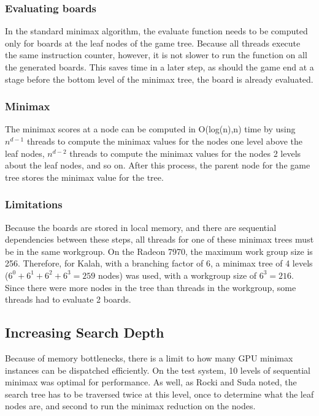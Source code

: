 \documentclass{article}
\begin{document}
\subsubsection{Evaluating boards}
In the standard minimax algorithm, the evaluate function needs to be computed only for boards at the leaf nodes of the game tree. Because all threads execute the same instruction counter, however, it is not slower to run the function on all the generated boards. This saves time in a later step, as should the game end at a stage before the bottom level of the minimax tree, the board is already evaluated.

\subsubsection{Minimax}
The minimax scores at a node can be computed in O(log(n),n) time by using $n^{d-1}$ threads to compute the minimax values for the nodes one level above the leaf nodes, $n^{d-2}$ threads to compute the minimax values for the nodes 2 levels about the leaf nodes, and so on. After this process, the parent node for the game tree stores the minimax value for the tree.

\subsubsection{Limitations}
Because the boards are stored in local memory, and there are sequential dependencies between these steps, all threads for one of these minimax trees must be in the same workgroup. On the Radeon 7970, the maximum work group size is 256. Therefore, for Kalah, with a branching factor of 6, a minimax tree of 4 levels ($6^0 + 6^1 + 6^2 + 6^3 = 259$ nodes) was used, with a workgroup size of $6^3 = 216$. Since there were more nodes in the tree than threads in the workgroup, some threads had to evaluate 2 boards.

\subsection{Increasing Search Depth}
Because of memory bottlenecks, there is a limit to how many GPU minimax instances can be dispatched efficiently. On the test system, 10 levels of sequential minimax was optimal for performance. As well, as Rocki and Suda\cite{rockisuda10} noted, the search tree has to be traversed twice at this level, once to determine what the leaf nodes are, and second to run the minimax reduction on the nodes.
\end{document}
